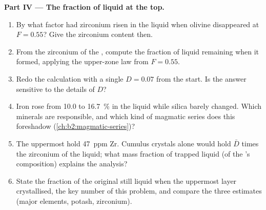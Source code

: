 \begin{problem}
\noindent\textbf{Part IV --- The fraction of liquid at the top.}
\begin{enumerate}[resume]
\item By what factor had zirconium risen in the liquid when olivine disappeared at
$F = 0.55$? Give the zirconium content then.
\item From the zirconium of the , compute the fraction of liquid remaining when
it formed, applying the upper-zone law from $F = 0.55$.
\item Redo the calculation with a single $D = 0.07$ from the start. Is the answer
sensitive to the details of $D$?
\item Iron rose from 10.0 to \qty{16.7}{\percent} in the liquid while silica barely
changed. Which minerals are responsible, and which kind of magmatic series does
this foreshadow (\cref{ch:b2:magmatic-series})?
\item The uppermost  hold \qty{47}{ppm} Zr. Cumulus crystals alone would hold
$\bar D$ times the zirconium of the liquid; what mass fraction of trapped liquid
(of the 's composition) explains the analysis?
\item State the fraction of the original  still liquid when the uppermost layer
crystallised, the key number of this problem, and compare the three estimates
(major elements, potash, zirconium).
\end{enumerate}
\end{problem}
